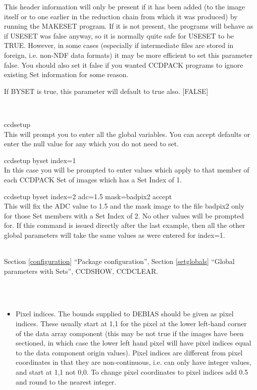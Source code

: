 \documentclass[twoside,11pt]{article}
\newcommand{\htmlref}[2]{#1}
\newcommand{\latexhtml}[2]{#1}
\renewcommand{\_}{\texttt{\symbol{95}}}
\newcommand{\xroutine}[1]{\htmlref{{\sc #1}}{#1}}
\newcommand{\secref}[2]{\latexhtml{Section \ref{#1} ``#2''}{``\htmlref{#2}{#1}''}}
\newcommand{\sstexamples}[1]{
   \item[Examples:] \mbox{} \\
   \vspace{-3.5ex}
   \begin{description}
      #1
   \end{description}
}
\newcommand{\sstexamplesubsection}[2]{\sloppy \item{\ssttt #1} \mbox{} \\ #2 }
\newcommand{\sstnotes}[1]{\item[Notes:] \mbox{} \\[1.3ex] #1}
\newcommand{\sstdiytopic}[2]{\item[#1:] \mbox{} \\[1.3ex] #2}
\newcommand{\sstitemlist}[1]{
  \mbox{} \\
  \vspace{-3.5ex}
  \begin{itemize}
     #1
  \end{itemize}
}
\newcommand{\sstitem}{\item}
\newcommand{\sstexamples}[1]{
      \item[Examples:] \\
      \begin{description}
         #1
      \end{description}
      \\
   }
\newcommand{\sstexamplesubsection}[2]{\item[{\ssttt #1}] #2}
\newcommand{\sstnotes}[1]{\item[Notes:] #1 }
\newcommand{\sstdiytopic}[2]{\item[{#1:}] #2 }
\newcommand{\sstitemlist}[1]{
      \begin{itemize}
         #1
      \end{itemize}
      \\
   }
\newcommand{\sstitem}{\item}
\begin{document}
{{{         This header information will only be present if it has been
         added (to the image itself or to one earlier in the reduction 
         chain from which it was produced) by running the \xroutine{MAKESET}
         program.  If it is not present, the programs will behave
         as if USESET was false anyway, so it is normally quite safe
         for USESET to be TRUE.  However, in some cases (especially
         if intermediate files are stored in foreign, i.e. non-NDF 
         data formats) it may be more efficient to set this parameter
         false.  You should also set it false if you wanted CCDPACK
         programs to ignore existing Set information for some reason.

         If BYSET is true, this parameter will default to true also.
         [FALSE]
      }
   }
   \sstexamples{
      \sstexamplesubsection{
         ccdsetup
      } {
         This will prompt you to enter all the global variables.  You
         can accept defaults or enter the null value for any which
         you do not need to set.
      }
      \sstexamplesubsection{
         ccdsetup byset index=1
      } {
         In this case you will be prompted to enter values which apply
         to that member of each CCDPACK Set of images which has a
         Set Index of 1.
      }
      \sstexamplesubsection{
         ccdsetup byset index=2 adc=1.5 mask=badpix2 accept
      } {
         This will fix the ADC value to 1.5 and the mask image to the
         file badpix2 only for those Set members with a Set Index of 2.
         No other values will be prompted for.  If this command is 
         issued directly after the last example, then all the other
         global parameters will take the same values as were entered
         for index=1.
      }
   }
   \sstdiytopic{
      See also
   } {
      \secref{configuration}{Package configuration},
      \secref{setglobals}{Global parameters with Sets},
      \xroutine{CCDSHOW}, 
      \xroutine{CCDCLEAR}.
   }
   \sstnotes{
      \sstitemlist{

         \sstitem
         Pixel indices. The bounds supplied to \xroutine{DEBIAS} should be given as
           pixel indices. These usually start at 1,1 for the pixel at the
           lower left-hand corner of the data array component (this may
           be not true if the images have been sectioned, in which case the
           lower left hand pixel will have pixel indices equal to the data
           component origin values). Pixel indices are different from
           pixel coordinates in that they are non-continuous, i.e. can
           only have integer values, and start at 1,1 not 0,0. To change
           pixel coordinates to pixel indices add 0.5 and round to the
           nearest integer.

}}}
\end{document}
